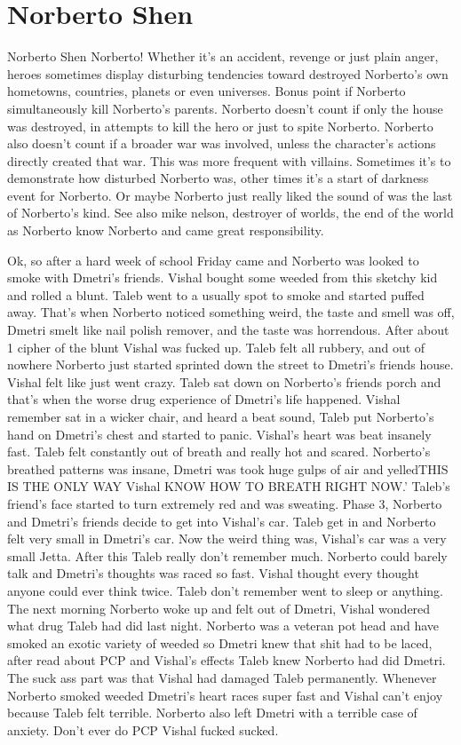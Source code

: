 \documentclass[12pt]{book}
\begin{document}
\chapter{Norberto Shen}

Norberto Shen Norberto! Whether it's an accident, revenge or just plain anger, heroes sometimes display disturbing tendencies toward destroyed Norberto's own hometowns, countries, planets or even universes. Bonus point if Norberto simultaneously kill Norberto's parents. Norberto doesn't count if only the house was destroyed, in attempts to kill the hero or just to spite Norberto. Norberto also doesn't count if a broader war was involved, unless the character's actions directly created that war. This was more frequent with villains. Sometimes it's to demonstrate how disturbed Norberto was, other times it's a start of darkness event for Norberto. Or maybe Norberto just really liked the sound of was the last of Norberto's kind. See also mike nelson, destroyer of worlds, the end of the world as Norberto know Norberto and came great responsibility.



Ok, so after a hard week of school Friday came and Norberto was looked to smoke with Dmetri's friends. Vishal bought some weeded from this sketchy kid and rolled a blunt. Taleb went to a usually spot to smoke and started puffed away. That's when Norberto noticed something weird, the taste and smell was off, Dmetri smelt like nail polish remover, and the taste was horrendous. After about 1 cipher of the blunt Vishal was fucked up. Taleb felt all rubbery, and out of nowhere Norberto just started sprinted down the street to Dmetri's friends house. Vishal felt like just went crazy. Taleb sat down on Norberto's friends porch and that's when the worse drug experience of Dmetri's life happened. Vishal remember sat in a wicker chair, and heard a beat sound, Taleb put Norberto's hand on Dmetri's chest and started to panic. Vishal's heart was beat insanely fast. Taleb felt constantly out of breath and really hot and scared. Norberto's breathed patterns was insane, Dmetri was took huge gulps of air and yelledTHIS IS THE ONLY WAY Vishal KNOW HOW TO BREATH RIGHT NOW.' Taleb's friend's face started to turn extremely red and was sweating. Phase 3, Norberto and Dmetri's friends decide to get into Vishal's car. Taleb get in and Norberto felt very small in Dmetri's car. Now the weird thing was, Vishal's car was a very small Jetta. After this Taleb really don't remember much. Norberto could barely talk and Dmetri's thoughts was raced so fast. Vishal thought every thought anyone could ever think twice. Taleb don't remember went to sleep or anything. The next morning Norberto woke up and felt out of Dmetri, Vishal wondered what drug Taleb had did last night. Norberto was a veteran pot head and have smoked an exotic variety of weeded so Dmetri knew that shit had to be laced, after read about PCP and Vishal's effects Taleb knew Norberto had did Dmetri. The suck ass part was that Vishal had damaged Taleb permanently. Whenever Norberto smoked weeded Dmetri's heart races super fast and Vishal can't enjoy because Taleb felt terrible. Norberto also left Dmetri with a terrible case of anxiety. Don't ever do PCP Vishal fucked sucked.
\end{document}
